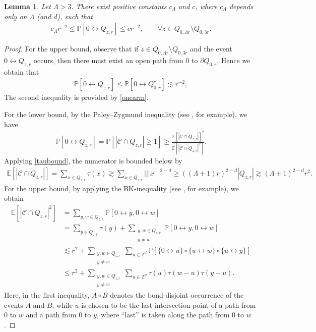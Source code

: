 \documentclass[11pt]{article}
\theoremstyle{definition}
\theoremstyle{remark}
\newcommand{\Z}{\mathbb{Z}}
\newcommand{\E}{\mathbb{E}}
\newcommand{\bP}{\mathbb{P}}
\numberwithin{equation}{section}
\theoremstyle{plain}
\newtheorem{lem}[theorem]{Lemma}
\theoremstyle{definition}
\theoremstyle{remark}
\theoremstyle{plain}
\newcommand{\tnorm}[1]{\vert\!\vert\!\vert #1 \vert\!\vert\!\vert}
\begin{document}
\begin{lem}\label{lambda}
Let $\Lambda>3$. There exist positive constants $c_{\Lambda}$ and $c$, where $c_{\Lambda}$ depends only on $\Lambda$ (and $d$), such that
    \begin{align*}
        c_{\Lambda}r^{-2}\le \bP[0 \leftrightarrow Q_{z,r}]\le cr^{-2},\qquad \forall z\in Q_{0,\Lambda r}\setminus Q_{0,3r}.
    \end{align*}
\end{lem}
\begin{proof}
    For the upper bound, observe that if $z \in Q_{0,\Lambda r}\setminus Q_{0,3r}$ and the event $0 \leftrightarrow Q_{z,r}$ occurs, then there must exist an open path from $0$ to $\partial Q_{0,r}$. Hence we obtain that
    \begin{align*}
       \bP[0 \leftrightarrow Q_{z,r}]\le \bP[0 \leftrightarrow Q_{0,r}^c] \lesssim r^{-2},
           \end{align*}
The second inequality is provided by \eqref{onearm}.

    For the lower bound, by the Paley--Zygmund inequality (see \cite[Lemma 4.1]{Kall}, for example), we have
    \begin{align*}
      \bP[0 \leftrightarrow Q_{z,r}]= \bP[|\mathcal C\cap Q_{z,r}|\ge 1]\ge \frac{\E[|\mathcal C\cap Q_{z,r}|]^2}{\E[|\mathcal C\cap Q_{z,r}|^2]}.
    \end{align*}
    Applying \eqref{taubound}, the numerator is bounded below by
    \begin{align*}
       \E[|\mathcal C\cap Q_{z,r}|]=\sum_{x \in Q_{z,r}}\tau(x)\gtrsim \sum_{x \in Q_{z,r}}\tnorm{x}^{2-d}\ge ((\Lambda+1) r)^{2-d}|Q_{z,r}|\gtrsim (\Lambda+1)^{2-d}r^2.
    \end{align*}
For the upper bound, by applying the BK-inequality (see \cite[Theorem 2.12]{Grim}, for example), we obtain
    \begin{align}\label{2ndmmt}
       \E[|\mathcal C\cap Q_{z,r}|^2]&=\sum_{y,w \in Q_{z,r}}\bP[0 \leftrightarrow y, 0\leftrightarrow w]\nonumber\\
       &=\sum_{y \in Q_{z,r}}\tau(y)+\sum_{\substack{y,w \in Q_{z,r}\\ y\neq w}}\bP[0 \leftrightarrow y, 0\leftrightarrow w]\nonumber\\
       &\lesssim r^2+\sum_{\substack{y,w \in Q_{z,r}\\ y\neq w}}\sum_{u \in \Z^d}\bP[\{0 \leftrightarrow u\} \circ\{ u\leftrightarrow w\} \circ\{ u\leftrightarrow y\}]\nonumber\\
       &\le  r^2+\sum_{\substack{y,w \in Q_{z,r}\\ y\neq w}}\sum_{u \in \Z^d}\tau(u)\tau(w-u)\tau(y-u).
    \end{align}
    Here, in the first inequality, $A \circ B$ denotes the bond-disjoint occurrence of the events $A$ and $B$, while $u$ is chosen to be the last intersection point of a path from $0$ to $w$
 and a path from $0$ to $y$, where ``last'' is taken along the path from $0$ to $w$.


\end{proof}
\end{document}
